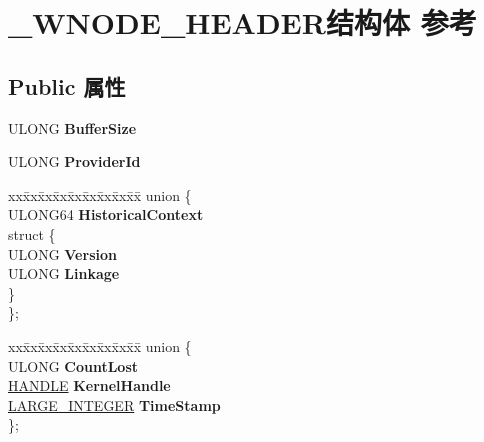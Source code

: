 \hypertarget{struct___w_n_o_d_e___h_e_a_d_e_r}{}\section{\+\_\+\+W\+N\+O\+D\+E\+\_\+\+H\+E\+A\+D\+E\+R结构体 参考}
\label{struct___w_n_o_d_e___h_e_a_d_e_r}
\subsection*{Public 属性}
\begin{DoxyCompactItemize}
\item 
\mbox{\label{struct___w_n_o_d_e___h_e_a_d_e_r_a586f28310a196957166713b8083f1393}} 
U\+L\+O\+NG {\bfseries Buffer\+Size}
\item 
\mbox{\label{struct___w_n_o_d_e___h_e_a_d_e_r_af808c0267d87db364cd99783092d6bda}} 
U\+L\+O\+NG {\bfseries Provider\+Id}
\item 
\mbox{\label{struct___w_n_o_d_e___h_e_a_d_e_r_a7733cbfaf10bc8991c445bc6cab61d5b}} 
\begin{tabbing}
xx\=xx\=xx\=xx\=xx\=xx\=xx\=xx\=xx\=\kill
union \{\\
\>ULONG64 {\bfseries HistoricalContext}\\
\mbox{\label{union___w_n_o_d_e___h_e_a_d_e_r_1_1_0D2892_a46e29d0b210e15991bbca4075fbe41c6}} 
\>struct \{\\
\>\>ULONG {\bfseries Version}\\
\>\>ULONG {\bfseries Linkage}\\
\>\} \\
\}; \\

\end{tabbing}\item 
\mbox{\label{struct___w_n_o_d_e___h_e_a_d_e_r_af4b1133a0146559ad6a8a7a4355243c8}} 
\begin{tabbing}
xx\=xx\=xx\=xx\=xx\=xx\=xx\=xx\=xx\=\kill
union \{\\
\>ULONG {\bfseries CountLost}\\
\>\hyperlink{interfacevoid}{HANDLE} {\bfseries KernelHandle}\\
\>\hyperlink{union___l_a_r_g_e___i_n_t_e_g_e_r}{LARGE\_INTEGER} {\bfseries TimeStamp}\\
\}; \\


\end{tabbing}
\end{DoxyCompactItemize}
